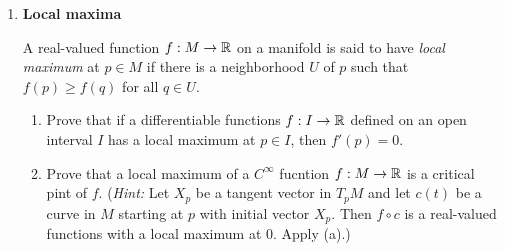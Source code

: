 \documentclass[12pt,a4paper]{report}
\begin{document}
\begin{enumerate}[label=8.\arabic*.]
\item \textbf{Local maxima}

A real-valued function $f: M \to \mathbb{R}$ on a manifold is said to have \textit{local maximum} at $p \in M$ if there is a neighborhood $U$ of $p$ such that $f(p) \ge f(q)$ for all $q \in U$.

\begin{enumerate}[label=(\alph*)]

\item Prove that if a differentiable functions $f: I \to \mathbb{R}$ defined on an open interval $I$ has a local maximum at $p \in I$, then $f'(p)=0$.
\item Prove that a local maximum of a $C^\infty$ fucntion $f: M \to \mathbb{R}$ is a critical pint of $f$.  (\textit{Hint: }Let $X_p$ be a tangent vector in $T_pM$ and let $c(t)$ be a curve in $M$ starting at $p$ with initial vector $X_p$.  Then $f \circ c$ is a real-valued functions with a local maximum at 0. Apply (a).)

\end{enumerate}

\end{enumerate}
\end{document}
